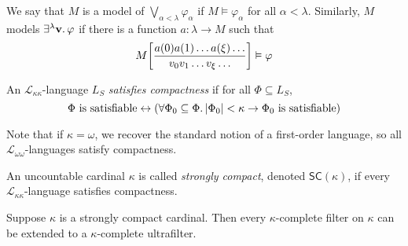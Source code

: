 We say that \( M \) is a model of \( \bigvee_{\alpha < \lambda} \varphi_\alpha \) if \( M \vDash \varphi_\alpha \) for all \( \alpha < \lambda \).
Similarly, \( M \) models \( \exists^\lambda \vb v.\, \varphi \) if there is a function \( a : \lambda \to M \) such that
\[ M\qty[\frac{a(0)a(1) \dots a(\xi)\dots}{v_0 v_1 \dots v_\xi \dots}] \vDash \varphi \]
\begin{definition}
    An \( \mathcal L_{\kappa\kappa} \)-language \( L_S \) \emph{satisfies compactness} if for all \( \Phi \subseteq L_S \),
    \[ \Phi \text{ is satisfiable} \leftrightarrow \qty(\forall \Phi_0 \subseteq \Phi.\, \abs{\Phi_0} < \kappa \to \Phi_0 \text{ is satisfiable}) \]
\end{definition}
Note that if \( \kappa = \omega \), we recover the standard notion of a first-order language, so all \( \mathcal L_{\omega\omega} \)-languages satisfy compactness.
\begin{definition}
    An uncountable cardinal \( \kappa \) is called \emph{strongly compact}, denoted \( \mathsf{SC}(\kappa) \), if every \( \mathcal L_{\kappa\kappa} \)-language satisfies compactness.
\end{definition}
\begin{theorem}
    Suppose \( \kappa \) is a strongly compact cardinal.
    Then every \( \kappa \)-complete filter on \( \kappa \) can be extended to a \( \kappa \)-complete ultrafilter.
\end{theorem}
